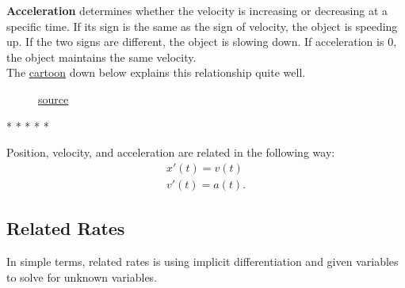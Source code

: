 \documentclass[12pt]{article}
\begin{document}
            \noindent \textbf{Acceleration} determines whether the velocity is increasing or decreasing at a specific time. If its sign is the same as the sign of velocity, the object is speeding up. If the two signs are different, the object is slowing down. If acceleration is $0$, the object maintains the same velocity.
            \\ The \hyperref[fig:posveloaccel]{cartoon} down below explains this relationship quite well.

            \begin{figure}[H]
                \begin{center}
                    \caption{\href{https://www.khanacademy.org/science/physics/one-dimensional-motion/acceleration-tutorial/a/acceleration-article?modal=1}{source}}
                    \label{fig:posveloaccel}
                \end{center}
            \end{figure}

            \begin{center}
                * * * * *
            \end{center}

            \noindent Position, velocity, and acceleration are related in the following way:
            \begin{gather*}
                x'(t) = v(t) \\
                v'(t) = a(t).
            \end{gather*}

        \subsection{Related Rates}
            In simple terms, related rates is using implicit differentiation and given variables to solve for unknown variables. %
\end{document}
